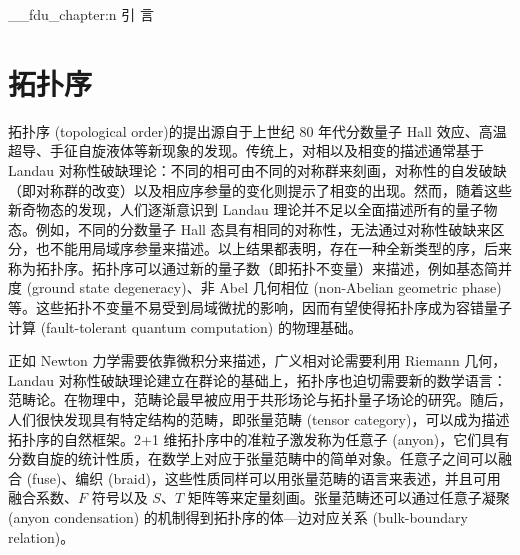\ExplSyntaxOn
\__fdu_chapter:n { 引 \quad 言 }
\ExplSyntaxOff

\begingroup

\renewcommand{\thesection}{\arabic{section}}

\section{拓扑序}

拓扑序 (topological order)\cite{wen1990topological,wen2013topological,wen2017colloquium,wen2019choreographed,zeng2019introduction}的提出源自于上世纪 80 年代分数量子 Hall 效应\cite{tsui1982two,laughlin1983anomalous}、高温超导、手征自旋液体\cite{kalmeyer1987equivalence,wen1989chiral}等新现象的发现。传统上，对相以及相变的描述通常基于 Landau 对称性破缺理论：不同的相可由不同的对称群来刻画，对称性的自发破缺（即对称群的改变）以及相应序参量的变化则提示了相变的出现\cite{landau1980statistical,pathria2011statistical}。然而，随着这些新奇物态的发现，人们逐渐意识到 Landau 理论并不足以全面描述所有的量子物态。例如，不同的分数量子 Hall 态具有相同的对称性，无法通过对称性破缺来区分，也不能用局域序参量来描述\cite{stone1992quantum}。以上结果都表明，存在一种全新类型的序，后来称为拓扑序。拓扑序可以通过新的量子数（即拓扑不变量）来描述，例如基态简并度 (ground state degeneracy)\cite{wen1989vacuum,wen1990ground}、非 Abel 几何相位 (non-Abelian geometric phase)\cite{wen1990topological}等。这些拓扑不变量不易受到局域微扰的影响，因而有望使得拓扑序成为容错量子计算 (fault-tolerant quantum computation) 的物理基础\cite{kitaev2003fault,freedman2003topological,nayak2008nonabelian,kong2023categorical}。

正如 Newton 力学需要依靠微积分来描述，广义相对论需要利用 Riemann 几何，Landau 对称性破缺理论建立在群论的基础上，拓扑序也迫切需要新的数学语言：范畴论。在物理中，范畴论最早被应用于共形场论\cite{segal1988definition,moore1989classical}与拓扑量子场论\cite{atiyah1988topological,turaev1992state}的研究。随后，人们很快发现具有特定结构的范畴，即张量范畴 (tensor category)，可以成为描述拓扑序的自然框架\cite{levin2005string,kitaev2006anyons}。2+1 维拓扑序中的准粒子激发称为任意子 (anyon)，它们具有分数自旋的统计性质，在数学上对应于张量范畴中的简单对象。任意子之间可以融合 (fuse)、编织 (braid)，这些性质同样可以用张量范畴的语言来表述，并且可用融合系数、$F$ 符号以及 $S$、$T$ 矩阵等来定量刻画\cite{bakalov2001lectures,kitaev2006anyons,bruillard2016rank,aasen2020topological}。张量范畴还可以通过任意子凝聚 (anyon condensation) 的机制得到拓扑序的体—边对应关系 (bulk-boundary relation)\cite{kong2014anyon,kong2014braided,kong2015boundary,kong2017boundary,lou2021dummy}。

